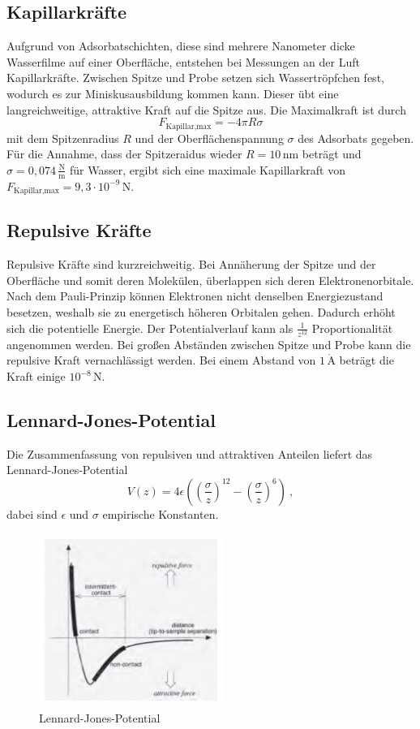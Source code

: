\subsection{Kapillarkräfte}
Aufgrund von Adsorbatschichten, diese sind mehrere Nanometer dicke Wasserfilme auf einer Oberfläche, entstehen bei Messungen an der Luft Kapillarkräfte. Zwischen Spitze und Probe setzen sich Wassertröpfchen fest, wodurch es zur Miniskusausbildung kommen kann. Dieser übt eine langreichweitige, attraktive Kraft auf die Spitze aus. Die Maximalkraft ist durch 
$$F_\text{Kapillar,max}=-4\pi R\sigma$$
mit dem Spitzenradius $R$ und der Oberflächenspannung $\sigma$ des Adsorbats gegeben. Für die Annahme, dass der Spitzeraidus wieder $R=10\,$nm beträgt und $\sigma=0,074\,\frac{\text{N}}{\text{m}}$ für Wasser, ergibt sich eine maximale Kapillarkraft von $F_\text{Kapillar,max}=9,3\cdot 10^{-9}\,$N.

\subsection{Repulsive Kräfte}
Repulsive Kräfte sind kurzreichweitig. Bei Annäherung der Spitze und der Oberfläche und somit deren Molekülen, überlappen sich deren Elektronenorbitale. Nach dem Pauli-Prinzip können Elektronen nicht denselben Energiezustand besetzen, weshalb sie zu energetisch höheren Orbitalen gehen. Dadurch erhöht sich die potentielle Energie. Der Potentialverlauf kann als $\frac{1}{z^{12}}$ Proportionalität angenommen werden. Bei großen Abständen zwischen Spitze und Probe kann die repulsive Kraft vernachlässigt werden. Bei einem Abstand von $1\,\mathring{\text{A}}$ beträgt die Kraft einige $10^{-8}\,$N.

\subsection{Lennard-Jones-Potential}
Die Zusammenfassung von repulsiven und attraktiven Anteilen liefert das Lennard-Jones-Potential
$$V(z)=4\epsilon\left(\left(\frac{\sigma}{z}\right)^{12}-\left(\frac{\sigma}{z}\right)^{6}\right)~,$$
dabei sind $\epsilon$ und $\sigma$ empirische Konstanten.
\begin{figure}[H]
    \centering
    \includegraphics[width=60mm,scale=0.5]{Rasterkraftmikroskop/include/Lennard-Jones-Potential.PNG}
    \caption{Lennard-Jones-Potential} 
    \label{fig:Lennard-Jones-Potential}
\end{figure}

